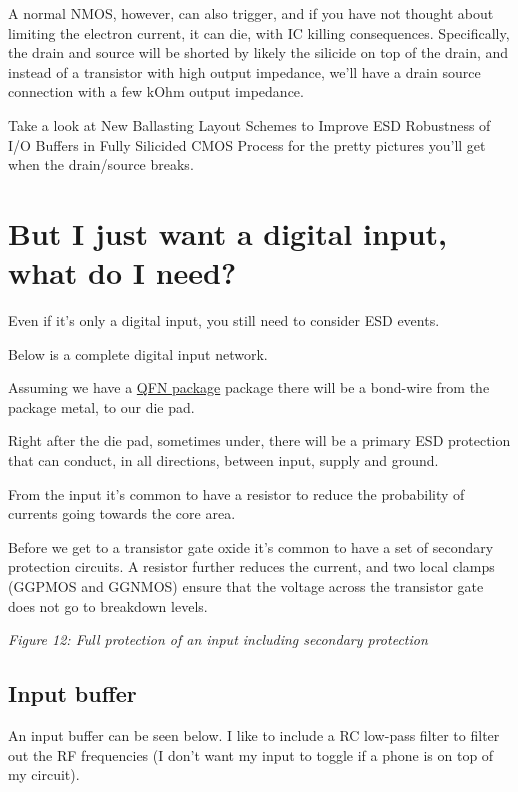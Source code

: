 A normal NMOS, however, can also trigger, and if you have not thought
about limiting the electron current, it can die, with IC killing
consequences. Specifically, the drain and source will be shorted by
likely the silicide on top of the drain, and instead of a transistor
with high output impedance, we'll have a drain source connection with a
few kOhm output impedance.

Take a look at New Ballasting Layout Schemes to Improve ESD Robustness
of I/O Buffers in Fully Silicided CMOS Process
 for the pretty pictures you'll get when
the drain/source breaks.

\section{But I just want a digital input, what do I
need?}\label{but-i-just-want-a-digital-input-what-do-i-need}

Even if it's only a digital input, you still need to consider ESD
events.

Below is a complete digital input network.

Assuming we have a
\href{https://en.wikipedia.org/wiki/Flat_no-leads_package}{QFN package}
package there will be a bond-wire from the package metal, to our die
pad.

Right after the die pad, sometimes under, there will be a primary ESD
protection that can conduct, in all directions, between input, supply
and ground.

From the input it's common to have a resistor to reduce the probability
of currents going towards the core area.

Before we get to a transistor gate oxide it's common to have a set of
secondary protection circuits. A resistor further reduces the current,
and two local clamps (GGPMOS and GGNMOS) ensure that the voltage across
the transistor gate does not go to breakdown levels.


{
\centering
{}
}

\emph{Figure 12: Full protection of an input including secondary
protection }

\subsection{Input buffer}\label{input-buffer}

An input buffer can be seen below. I like to include a RC low-pass
filter to filter out the RF frequencies (I don't want my input to toggle
if a phone is on top of my circuit).

